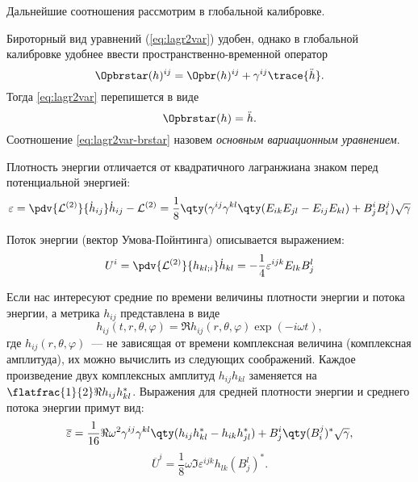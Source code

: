 \documentclass[\docroot/reports/draft/report.tex]{subfiles}
\begin{document}
    Дальнейшие соотношения рассмотрим в глобальной калибровке.

    Бироторный вид уравнений (\autoref{eq:lagr2var}) удобен, однако в глобальной калибровке удобнее ввести пространственно-временной оператор
    \begin{equation}\label{eq:brtr}
        \Opbrstar(h)^{ij} = \Opbr(h)^{ij} + \gamma^{ij} \trace{\ddot{h}} .
    \end{equation}
    Тогда \autoref{eq:lagr2var} перепишется в виде
    \begin{equation}\label{eq:lagr2var-brstar}
        \Opbrstar(h) = \ddot{h} .
    \end{equation}
    Соотношение \ref{eq:lagr2var-brstar} назовем \textit{основным вариационным уравнением}.

    Плотность энергии отличается от квадратичного лагранжиана знаком перед потенциальной энергией:
    \begin{equation}\label{eq:eps}
        \varepsilon = \pdv{\mathcal{L}^{(2)}}{\dot{h}_{ij}} \dot{h}_{ij} - \mathcal{L}^{(2)}
                    = \frac{1}{8} \qty(
            \gamma^{ij} \gamma^{kl} \qty(
                E_{ik} E_{jl} - E_{ij} E_{kl}
            ) + B^i_j B^j_i
        ) \sqrt{\gamma}
    \end{equation}

    Поток энергии (вектор Умова-Пойнтинга) описывается выражением:
    \begin{equation}\label{eq:Uil}
        U^i = \pdv{\mathcal{L}^{(2)}}{h_{kl;i}} \dot{h}_{kl}
            = -\frac{1}{4}\varepsilon^{ijk} E_{lk} B^l_j
    \end{equation}

    Если нас интересуют средние по времени величины плотности энергии и потока энергии, а метрика $h_{ij}$ представлена в виде
    \begin{equation*}
        h_{ij}(t,r,\theta,\varphi) = \Re{h_{ij}(r,\theta,\varphi)\exp(-i \omega t)},
    \end{equation*}
    где $h_{ij}(r,\theta,\varphi)$~--- не зависящая от времени комплексная величина (комплексная амплитуда), их можно вычислить из следующих соображений. Каждое произведение двух комплексных амплитуд $h_{ij} h_{kl}$ заменяется на $\flatfrac{1}{2} \Re{h_{ij} h^*_{kl}}$. Выражения для средней плотности энергии и среднего потока энергии примут вид:
    \begin{equation}\label{eq:epsm}
        \overline{\varepsilon} = \frac{1}{16} \Re{
            \omega^2 \gamma^{ij} \gamma^{kl} \qty(
                h_{ij} h^*_{kl} - h_{ik} h^*_{jl}
            ) + B^i_j \qty(B^j_i)^*
        } \sqrt{\gamma},
    \end{equation}
    \begin{equation}\label{eq:Uilm}
        \overline{U}^i = \frac{1}{8} \omega \Im{\varepsilon^{ijk} h_{lk} (B^l_j)^*} .
    \end{equation}
\end{document}
